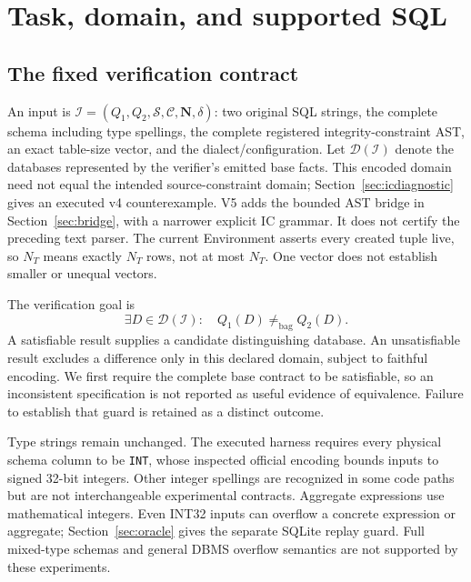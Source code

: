\documentclass[3p,times,authoryear]{elsarticle}
\begin{document}
\section{Task, domain, and supported SQL}\label{sec:task}
\subsection{The fixed verification contract}
An input is $\mathcal I=(Q_1,Q_2,\mathcal S,\mathcal C,\mathbf N,\delta)$: two original SQL strings, the complete schema including type spellings, the complete registered integrity-constraint AST, an exact table-size vector, and the dialect/configuration. Let $\mathcal D(\mathcal I)$ denote the databases represented by the verifier's emitted base facts. This encoded domain need not equal the intended source-constraint domain; Section~\ref{sec:icdiagnostic} gives an executed v4 counterexample. V5 adds the bounded AST bridge in Section~\ref{sec:bridge}, with a narrower explicit IC grammar. It does not certify the preceding text parser. The current Environment asserts every created tuple live, so $N_T$ means exactly $N_T$ rows, not at most $N_T$. One vector does not establish smaller or unequal vectors.

The verification goal is
\begin{equation}
 \exists D\in\mathcal D(\mathcal I):\quad Q_1(D)\ne_{\mathrm{bag}}Q_2(D).
 \label{eq:goal}
\end{equation}
A satisfiable result supplies a candidate distinguishing database. An unsatisfiable result excludes a difference only in this declared domain, subject to faithful encoding. We first require the complete base contract to be satisfiable, so an inconsistent specification is not reported as useful evidence of equivalence. Failure to establish that guard is retained as a distinct outcome.

Type strings remain unchanged. The executed harness requires every physical schema column to be \texttt{INT}, whose inspected official encoding bounds inputs to signed 32-bit integers. Other integer spellings are recognized in some code paths but are not interchangeable experimental contracts. Aggregate expressions use mathematical integers. Even INT32 inputs can overflow a concrete expression or aggregate; Section~\ref{sec:oracle} gives the separate SQLite replay guard. Full mixed-type schemas and general DBMS overflow semantics are not supported by these experiments.
\end{document}
